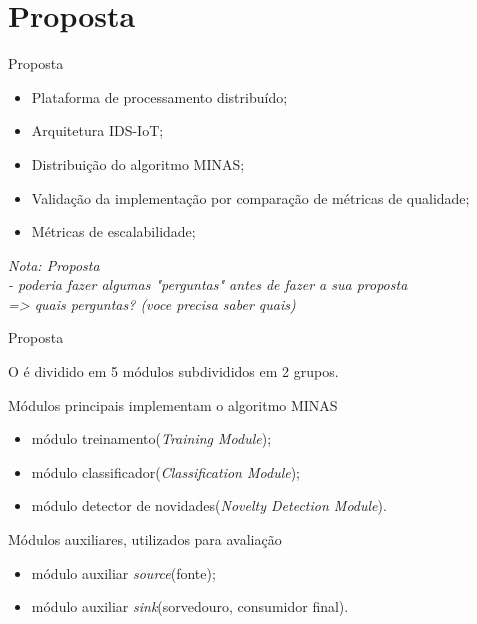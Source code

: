 \documentclass[aspectratio=43,10pt]{beamer}
\newcommand{\nota}[1]{\hspace*{-0.5cm}\textit{{\color[rgb]{1,0,0}Nota: #1}}}
\begin{document}
\section{Proposta}
\begin{frame}[fragile]{Proposta}
\begin{itemize}
\item Plataforma de processamento distribuído;
\item Arquitetura IDS-IoT;
\item Distribuição do algoritmo MINAS;
\item Validação da implementação por comparação de métricas de qualidade;
\item Métricas de escalabilidade;
\end{itemize}
\nota{Proposta\\
- poderia fazer algumas "perguntas" antes de fazer a sua proposta\\
=> quais perguntas? (voce precisa saber quais)}
\end{frame}


\newcommand{\source}{módulo auxiliar \emph{source}\xspace}
\newcommand{\sink}{módulo auxiliar \emph{sink}\xspace}

\newcommand{\offline}{módulo treinamento\xspace}
\newcommand{\classify}{módulo classificador\xspace}
\newcommand{\detector}{módulo detector de novidades\xspace}

\begin{frame}[fragile]{Proposta}

  O \mfog é dividido em 5 módulos subdivididos em 2 grupos.
  
  \begin{alertblock}{Módulos principais implementam o algoritmo MINAS}
    \begin{itemize}
      \item \offline (\emph{Training Module});
      \item \classify (\emph{Classification Module});
      \item \detector (\emph{Novelty Detection Module}).
    \end{itemize}
  \end{alertblock}
  \begin{alertblock}{Módulos auxiliares, utilizados para avaliação}
    \begin{itemize}
      \item \source (fonte);
      \item \sink (sorvedouro, consumidor final).
    \end{itemize}
  \end{alertblock}
\end{frame}
\end{document}
